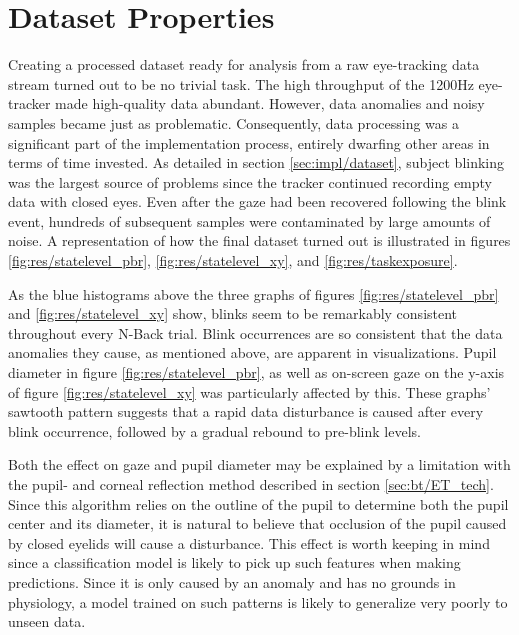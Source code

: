 \section{Dataset Properties} \label{sec:disc/dataset}

Creating a processed dataset ready for analysis from a raw eye-tracking data stream turned out to be no trivial task. The high throughput of the 1200Hz eye-tracker made high-quality data abundant. However, data anomalies and noisy samples became just as problematic. Consequently, data processing was a significant part of the implementation process, entirely dwarfing other areas in terms of time invested. As detailed in section \ref{sec:impl/dataset}, subject blinking was the largest source of problems since the tracker continued recording empty data with closed eyes. Even after the gaze had been recovered following the blink event, hundreds of subsequent samples were contaminated by large amounts of noise. A representation of how the final dataset turned out is illustrated in figures \ref{fig:res/statelevel_pbr}, \ref{fig:res/statelevel_xy}, and \ref{fig:res/taskexposure}.

As the blue histograms above the three graphs of figures \ref{fig:res/statelevel_pbr} and \ref{fig:res/statelevel_xy} show, blinks seem to be remarkably consistent throughout every N-Back trial. Blink occurrences are so consistent that the data anomalies they cause, as mentioned above, are apparent in visualizations. Pupil diameter in figure \ref{fig:res/statelevel_pbr}, as well as on-screen gaze on the y-axis of figure \ref{fig:res/statelevel_xy} was particularly affected by this. These graphs' sawtooth pattern suggests that a rapid data disturbance is caused after every blink occurrence, followed by a gradual rebound to pre-blink levels. 

Both the effect on gaze and pupil diameter may be explained by a limitation with the pupil- and corneal reflection method described in section \ref{sec:bt/ET_tech}. Since this algorithm relies on the outline of the pupil to determine both the pupil center and its diameter, it is natural to believe that occlusion of the pupil caused by closed eyelids will cause a disturbance. This effect is worth keeping in mind since a classification model is likely to pick up such features when making predictions. Since it is only caused by an anomaly and has no grounds in physiology, a model trained on such patterns is likely to generalize very poorly to unseen data.

